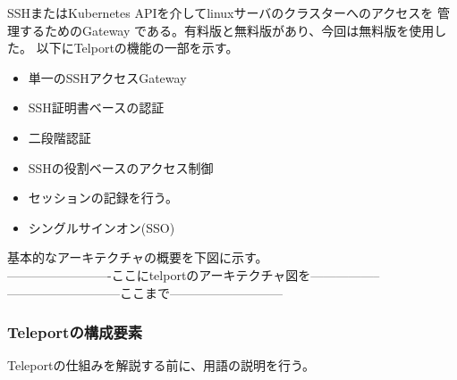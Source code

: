 \documentclass[12pt,a4paper,titlepage]{jsarticle}
\begin{document}
SSHまたはKubernetes APIを介してlinuxサーバのクラスターへのアクセスを
管理するためのGateway である。有料版と無料版があり、今回は無料版を使用した。
以下にTelportの機能の一部を示す。

\begin{itemize}
    \item 単一のSSHアクセスGateway
    \item SSH証明書ベースの認証
    \item 二段階認証
    \item SSHの役割ベースのアクセス制御
    \item セッションの記録を行う。
    \item シングルサインオン(SSO)
\end{itemize}

基本的なアーキテクチャの概要を下図に示す。
\\-------------------------ここにtelportのアーキテクチャ図を-----------------
\\---------------------------ここまで---------------------------\par




\subsubsection*{Teleportの構成要素}
Teleportの仕組みを解説する前に、用語の説明を行う。

    
\end{document}
